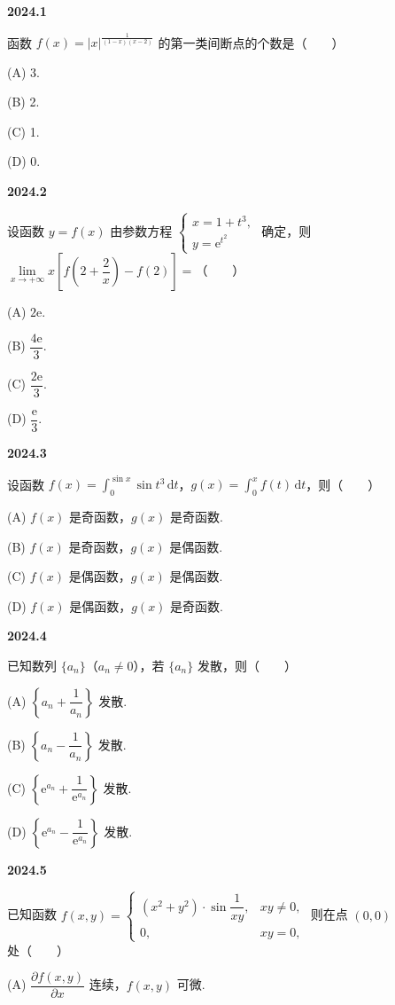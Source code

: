 \documentclass[UTF8,12pt,fontset=windows]{ctexart}
\begin{document}
{\large\bfseries 2024.1}

函数 $f(x)=|x|^{\frac{1}{(1-x)(x-2)}}$ 的第一类间断点的个数是（　　）

(A) 3.

(B) 2.

(C) 1.

(D) 0.

\vfill
\newpage
{\large\bfseries 2024.2}

设函数 $y=f(x)$ 由参数方程 $\begin{cases} x=1+t^3, \\ y=\mathrm{e}^{t^2} \end{cases}$ 确定，则 $\lim\limits_{x\to+\infty}x\left[f\left(2+\dfrac{2}{x}\right)-f(2)\right]=$（　　）

(A) $2\mathrm{e}$.

(B) $\dfrac{4\mathrm{e}}{3}$.

(C) $\dfrac{2\mathrm{e}}{3}$.

(D) $\dfrac{\mathrm{e}}{3}$.

\vfill
\newpage
{\large\bfseries 2024.3}

设函数 $f(x)=\int_0^{\sin x}\sin t^3\,\mathrm{d}t$，$g(x)=\int_0^x f(t)\,\mathrm{d}t$，则（　　）

(A) $f(x)$ 是奇函数，$g(x)$ 是奇函数.

(B) $f(x)$ 是奇函数，$g(x)$ 是偶函数.

(C) $f(x)$ 是偶函数，$g(x)$ 是偶函数.

(D) $f(x)$ 是偶函数，$g(x)$ 是奇函数.

\vfill
\newpage
{\large\bfseries 2024.4}

已知数列 $\{a_n\}$（$a_n\neq0$），若 $\{a_n\}$ 发散，则（　　）

(A) $\left\{a_n+\dfrac{1}{a_n}\right\}$ 发散.

(B) $\left\{a_n-\dfrac{1}{a_n}\right\}$ 发散.

(C) $\left\{\mathrm{e}^{a_n}+\dfrac{1}{\mathrm{e}^{a_n}}\right\}$ 发散.

(D) $\left\{\mathrm{e}^{a_n}-\dfrac{1}{\mathrm{e}^{a_n}}\right\}$ 发散.

\vfill
\newpage
{\large\bfseries 2024.5}

已知函数 $f(x,y)=\begin{cases}(x^2+y^2)\cdot\sin\dfrac{1}{xy},&xy\neq0,\\[4pt]0,&xy=0,\end{cases}$ 则在点 $(0,0)$ 处（　　）

(A) $\dfrac{\partial f(x,y)}{\partial x}$ 连续，$f(x,y)$ 可微.
\end{document}

